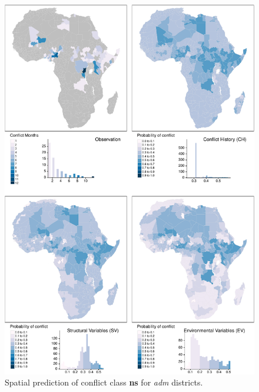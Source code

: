 \documentclass[a4paper,11pt]{article}
\begin{document}
\begin{tiny}
\begin{figure}[H]
{\centering \includegraphics{thesis_files/figure-latex/appendix-spatial-adm-ns-1} 

}

\caption[Spatial prediction of conflict class \textbf{ns} for \textit{adm} districts.]{Spatial prediction of conflict class \textbf{ns} for \textit{adm} districts.}\label{fig:appendix-spatial-adm-ns}
\end{figure}
\begin{figure}[H]


\end{figure}
\end{tiny}
\end{document}
